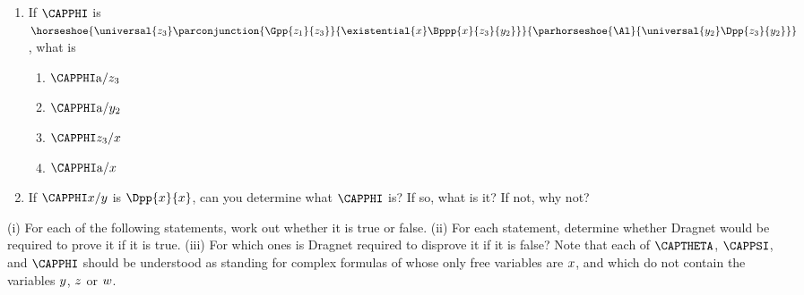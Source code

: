 \begin{enumerate}
\item If $\CAPPHI$ is $\horseshoe{\universal{\variable{z_{\integer{3}}}}\parconjunction{\Gpp{\variable{z_{\integer{1}}}}{\variable{z_{\integer{3}}}}}{\existential{\variable{x}}\Bppp{\variable{x}}{\variable{z_{\integer{3}}}}{\variable{y_{\integer{2}}}}}}{\parhorseshoe{\Al}{\universal{\variable{y_{\integer{2}}}}\Dpp{\variable{z_{\integer{3}}}}{\variable{y_{\integer{2}}}}}}$, what is
\begin{enumerate}
\item $\CAPPHI\constant{a}/\variable{z_{\integer{3}}}$
\item $\CAPPHI\constant{a}/\variable{y_{\integer{2}}}$
\item $\CAPPHI\variable{z_{\integer{3}}}/\variable{x}$
\item $\CAPPHI\constant{a}/\variable{x}$
\end{enumerate} 
\item If $\CAPPHI\variable{x}/\variable{y}$ is $\Dpp{\variable{x}}{\variable{x}}$, can you determine what $\CAPPHI$ is? If so, what is it? If not, why not?
\end{enumerate}

 (i) For each of the following statements, work out whether it is true or false. 
(ii) For each statement, determine whether Dragnet would be required to prove it if it is true. 
(iii) For which ones is Dragnet required to disprove it if it is false? Note that each of $\CAPTHETA$, $\CAPPSI$, and $\CAPPHI$ should be understood as standing for complex formulas of \GQL{} whose only free variables are $x$, and which do not contain the variables $y$, $z$ or $w$. 

